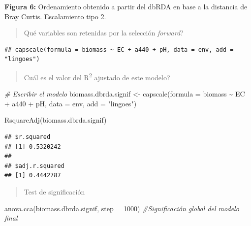\documentclass[
]{book}
\newenvironment{Shaded}{\begin{snugshade}}{\end{snugshade}}
\newcommand{\AttributeTok}[1]{\textcolor[rgb]{0.77,0.63,0.00}{#1}}
\newcommand{\CommentTok}[1]{\textcolor[rgb]{0.56,0.35,0.01}{\textit{#1}}}
\newcommand{\DecValTok}[1]{\textcolor[rgb]{0.00,0.00,0.81}{#1}}
\newcommand{\FunctionTok}[1]{\textcolor[rgb]{0.00,0.00,0.00}{#1}}
\newcommand{\NormalTok}[1]{#1}
\newcommand{\OtherTok}[1]{\textcolor[rgb]{0.56,0.35,0.01}{#1}}
\newcommand{\SpecialCharTok}[1]{\textcolor[rgb]{0.00,0.00,0.00}{#1}}
\newcommand{\StringTok}[1]{\textcolor[rgb]{0.31,0.60,0.02}{#1}}
\begin{document}
\textbf{Figura 6:} Ordenamiento obtenido a partir del dbRDA en base a la distancia de Bray Curtis. Escalamiento tipo 2.

\begin{quote}
Qué variables son retenidas por la selección \emph{forward}?
\end{quote}

\begin{Shaded}
\end{Shaded}

\begin{verbatim}
## capscale(formula = biomass ~ EC + a440 + pH, data = env, add = "lingoes")
\end{verbatim}

\begin{quote}
Cuál es el valor del R\textsuperscript{2} ajustado de este modelo?
\end{quote}

\begin{Shaded}
\begin{Highlighting}[]
\CommentTok{\# Escribir el modelo}
\NormalTok{biomass.dbrda.signif }\OtherTok{\textless{}{-}} \FunctionTok{capscale}\NormalTok{(}\AttributeTok{formula =}\NormalTok{ biomass }\SpecialCharTok{\textasciitilde{}}\NormalTok{ EC }\SpecialCharTok{+}\NormalTok{ a440 }\SpecialCharTok{+}\NormalTok{ pH, }\AttributeTok{data =}\NormalTok{ env, }\AttributeTok{add =} \StringTok{"lingoes"}\NormalTok{)}

\FunctionTok{RsquareAdj}\NormalTok{(biomass.dbrda.signif)}
\end{Highlighting}
\end{Shaded}

\begin{verbatim}
## $r.squared
## [1] 0.5320242
## 
## $adj.r.squared
## [1] 0.4442787
\end{verbatim}

\begin{quote}
Test de significación
\end{quote}

\begin{Shaded}
\begin{Highlighting}[]
\FunctionTok{anova.cca}\NormalTok{(biomass.dbrda.signif, }\AttributeTok{step =} \DecValTok{1000}\NormalTok{) }\CommentTok{\#Significación global del modelo final}
\end{Highlighting}
\end{Shaded}
\end{document}
